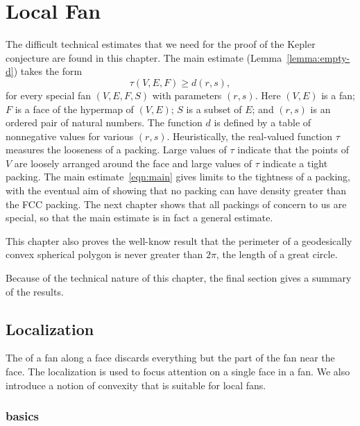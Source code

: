 %
\chapter{Local Fan}\label{sec:local}


\begin{summary}
  The difficult technical estimates that we need for the proof of the
  Kepler conjecture are found in this chapter.  The main estimate
  (Lemma~\ref{lemma:empty-d}) takes the form
\begin{equation}\label{eqn:main}
\tau(V,E,F) \ge d(r,s),
\end{equation}
for every special fan $(V,E,F,S)$ with parameters $(r,s)$.  Here
$(V,E)$ is a fan; $F$ is a face of the hypermap of $(V,E)$; $S$ is a
subset of $E$; and $(r,s)$ is an ordered pair of natural numbers.  The
function $d$ is defined by a table of nonnegative values for various
$(r,s)$.  Heuristically, the real-valued function $\tau$ measures the
looseness of a packing.  Large values of $\tau$ indicate that the
points of $V$ are loosely arranged around the face and large values of
$\tau$ indicate a tight packing.  The main estimate~\ref{eqn:main}
gives limits to the tightness of a packing, with the eventual aim of
showing that no packing can have density greater than the
FCC packing.  The next chapter  shows that all
packings of concern to us are special, so that the main estimate is in
fact a general estimate.

This chapter also proves the well-know result that the perimeter of a
geodesically convex spherical polygon is never greater than $2\pi$,
the length of a great circle.

Because of the technical nature of this chapter, the final section gives a summary
of the results.
\end{summary}


\section{Localization}

The  of a fan along
a face discards everything but the part of the fan near the face.  
The localization is used to focus attention on a single face
in a fan.  
We also introduce a notion of convexity that is suitable for local fans.

\subsection{basics}

